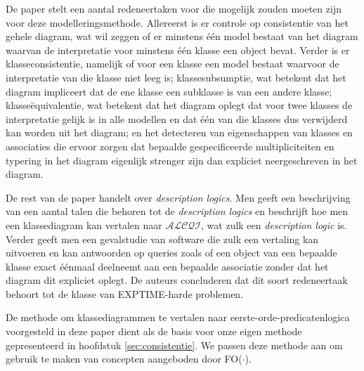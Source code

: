 De paper stelt een aantal redeneertaken voor die mogelijk zouden moeten zijn voor deze modelleringsmethode. Allereerst is er controle op consistentie van het gehele diagram, wat wil zeggen of er minstens \'e\'en model bestaat van het diagram waarvan de interpretatie voor minstens \'e\'en klasse een object bevat. Verder is er klasseconsistentie, namelijk of voor een klasse een model bestaat waarvoor de interpretatie van die klasse niet leeg is; klassesubsumptie, wat betekent dat het diagram impliceert dat de ene klasse een subklasse is van een andere klasse; klasse\"equivalentie, wat betekent dat het diagram oplegt dat voor twee klasses de interpretatie gelijk is in alle modellen en dat \'e\'en van die klasses dus verwijderd kan worden uit het diagram; en het detecteren van eigenschappen van klasses en associaties die ervoor zorgen dat bepaalde gespecificeerde multipliciteiten en typering in het diagram eigenlijk strenger zijn dan expliciet neergeschreven in het diagram.

De rest van de paper handelt over \textit{description logics}. Men geeft een beschrijving van een aantal talen die behoren tot de \textit{description logics} en beschrijft hoe men een klassediagram kan vertalen naar $\mathcal{ALCQI}$\cite{LutzCarsten2005Tcof}, wat zulk een \textit{description logic} is. Verder geeft men een gevalstudie van software die zulk een vertaling kan uitvoeren en kan antwoorden op queries zoals of een object van een bepaalde klasse exact \'e\'enmaal deelneemt aan een bepaalde associatie zonder dat het diagram dit expliciet oplegt. De auteurs concluderen dat dit soort redeneertaak behoort tot de klasse van EXPTIME-harde problemen.

De methode om klassediagrammen te vertalen naar eerste-orde-predicatenlogica voorgesteld in deze paper dient als de basis voor onze eigen methode gepresenteerd in hoofdstuk \ref{sec:consistentie}. We passen deze methode aan om gebruik te maken van concepten aangeboden door FO($\cdot$)\cite{DeCatBroes2014PLaa}.

